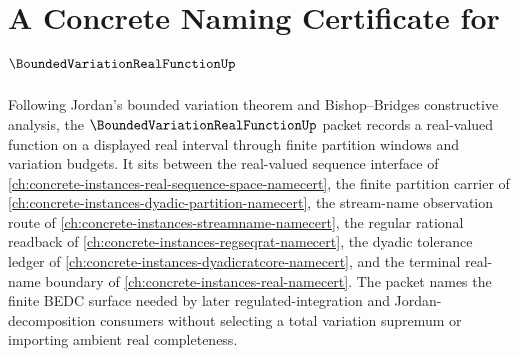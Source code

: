 \chapter{A Concrete Naming Certificate for $\BoundedVariationRealFunctionUp$}
\label{ch:concrete-instances-bounded-variation-real-function-namecert}

Following Jordan's bounded variation theorem and Bishop--Bridges constructive analysis, the $\BoundedVariationRealFunctionUp$ packet records a real-valued function on a displayed real interval through finite partition windows and variation budgets. It sits between the real-valued sequence interface of \autoref{ch:concrete-instances-real-sequence-space-namecert}, the finite partition carrier of \autoref{ch:concrete-instances-dyadic-partition-namecert}, the stream-name observation route of \autoref{ch:concrete-instances-streamname-namecert}, the regular rational readback of \autoref{ch:concrete-instances-regseqrat-namecert}, the dyadic tolerance ledger of \autoref{ch:concrete-instances-dyadicratcore-namecert}, and the terminal real-name boundary of \autoref{ch:concrete-instances-real-namecert}. The packet names the finite BEDC surface needed by later regulated-integration and Jordan-decomposition consumers without selecting a total variation supremum or importing ambient real completeness.

